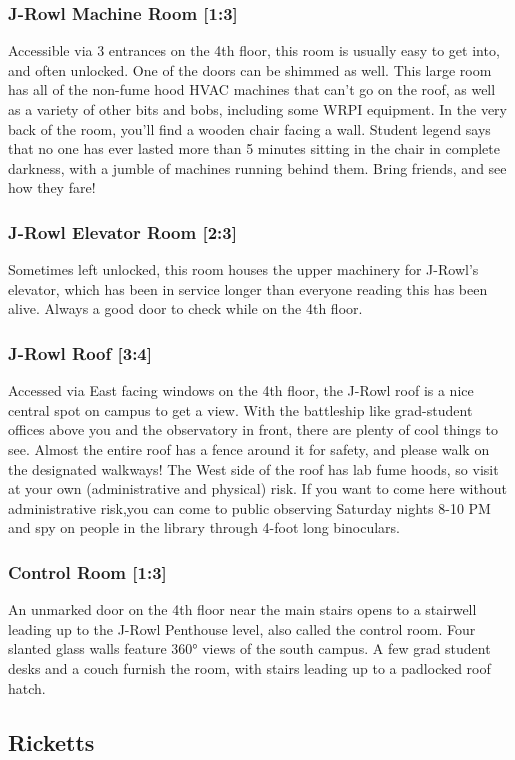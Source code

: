 \documentclass{article}
\begin{document}
\subsubsection{J-Rowl Machine Room [1:3]}
Accessible via 3 entrances on the 4th floor, this room is usually easy to get into, and often unlocked. One of the doors can be shimmed as well. This large room has all of the non-fume hood HVAC machines that can’t go on the roof, as well as a variety of other bits and bobs, including some WRPI equipment. In the very back of the room, you’ll find a wooden chair facing a wall. Student legend says that no one has ever lasted more than 5 minutes sitting in the chair in complete darkness, with a jumble of machines running behind them. Bring friends, and see how they fare!

 \subsubsection{J-Rowl Elevator Room [2:3]}
Sometimes left unlocked, this room houses the upper machinery for J-Rowl’s elevator, which has been in service longer than everyone reading this has been alive. Always a good door to check while on the 4th floor.
\subsubsection{J-Rowl Roof [3:4]}
Accessed via East facing windows on the 4th floor, the J-Rowl roof is a nice central spot on campus to get a view. With the battleship like grad-student offices above you and the observatory in front, there are plenty of cool things to see. Almost the entire roof has a fence around it for safety, and please walk on the designated walkways! The West side of the roof has lab fume hoods, so visit at your own (administrative and physical) risk. If you want to come here without administrative risk,you can come to public observing Saturday nights 8-10 PM and spy on people in the library through 4-foot long binoculars.
\subsubsection{Control Room [1:3]}
An unmarked door on the 4th floor near the main stairs opens to a stairwell leading up to the J-Rowl Penthouse level, also called the control room. Four slanted glass walls feature 360° views of the south campus. A few grad student desks and a couch furnish the room, with stairs leading up to a padlocked roof hatch.
\pagebreak
\subsection{Ricketts}
\end{document}

